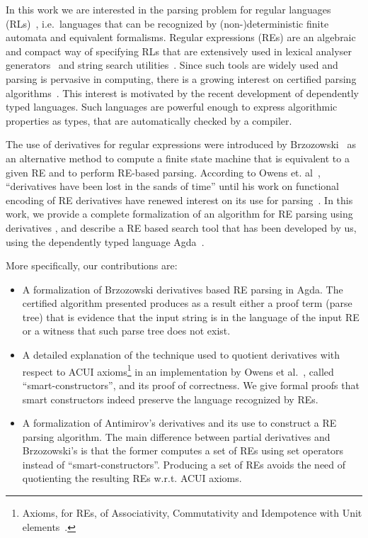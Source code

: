 \documentclass[review]{elsarticle}
\begin{document}
In this work we are interested in the parsing problem for regular
languages (RLs)~\cite{Hopcroft2000}, i.e.~languages that can be
recognized by (non-)deterministic finite automata and equivalent
formalisms. Regular expressions (REs) are an algebraic and compact way
of specifying RLs that are extensively used in lexical analyser
generators~\cite{Lesk1990} and string search utilities~\cite{Grep}.
Since such tools are widely used and parsing is pervasive in
computing, there is a growing interest on certified parsing
algorithms~\cite{FirsovU13,FirsovU14,Danielsson2010}.  This interest
is motivated by the recent development of dependently typed
languages. Such languages are powerful enough to express algorithmic
properties as types, that are automatically checked by a compiler.

The use of derivatives for regular expressions were introduced by
Brzozowski~\cite{Brzozowski1964} as an alternative method to compute a
finite state machine that is equivalent to a given RE and to perform
RE-based parsing. According to Owens et. al~\cite{Owens2009},
``derivatives have been lost in the sands of time'' until his work on
functional encoding of RE derivatives have renewed interest on its use
for parsing~\cite{Might2011,Fischer2010}.  In this work, we provide a
complete formalization of an algorithm for RE parsing using
derivatives \cite{Owens2009}, and describe a RE based search tool that
has been developed by us, using the dependently typed language
Agda~\cite{Norell2009}.

More specifically, our contributions are:
\begin{itemize}
  \item A formalization of Brzozowski derivatives based RE parsing in
    Agda. The certified algorithm presented produces as a result
    either a proof term (parse tree) that is evidence that the input
    string is in the language of the input RE or a witness that such
    parse tree does not exist.

  \item A detailed explanation of the technique used to quotient
    derivatives with respect to ACUI axioms\footnote{Axioms, for REs,
      of Associativity, Commutativity and Idempotence with Unit
      elements~\cite{Brzozowski1964}.} in an implementation by Owens
    et al.~\cite{Owens2009}, called ``smart-constructors'', and its
    proof of correctness. We give formal proofs that smart
    constructors indeed preserve the language recognized by REs.

  \item A formalization of Antimirov's derivatives and its use to
    construct a RE parsing algorithm. The main difference between
    partial derivatives and Brzozowski's is that the former computes a
    set of REs using set operators instead of ``smart-constructors''.
    Producing a set of REs avoids the need of quotienting the
    resulting REs w.r.t. ACUI axioms.
\end{itemize}
\end{document}
